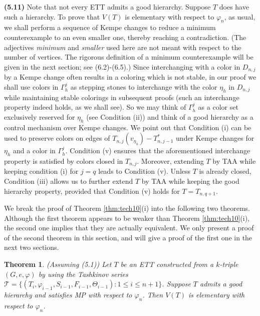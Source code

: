 \documentclass[11pt]{article}
\newtheorem{theorem}{Theorem}[section]
\newcommand{\TT}{\mathcal {T}}
\newcommand{\phiv}{\varphi}
\begin{document}
{\bf (5.11)} Note that not every ETT admits a good hierarchy. Suppose $T$ does have such a hierarchy. To prove that
$V(T)$ is elementary with respect to $\varphi_n$, as usual, we shall perform a sequence of Kempe changes to reduce a minimum counterexample 
to an even smaller one, thereby reaching a contradiction. (The adjectives {\em minimum} and {\em smaller} used here are not meant 
with respect to the number of vertices. The rigorous definition of a minimum counterexample will be given in the next section; see (6.2)-(6.5).) 
Since interchanging with a color in $D_{n,j}$ by a Kempe change often results in 
a coloring which is not stable, in our proof we shall use colors in $\Gamma^{j}_h$ as stepping stones to interchange with the color 
$\eta_h$ in $D_{n,j}$ while maintaining stable colorings in subsequent proofs (such an interchange property indeed holds, as we shall see). 
So we may think of $\Gamma^{j}_h$ as a color set exclusively reserved for $\eta_h$ (see Condition (ii)) and think of a good hierarchy as a 
control mechanism over Kempe changes. We point out that Condition (i) can be used to preserve colors on edges of $T_{n,j}(v_{\eta_h})-T_{n,j-1}^*$ 
under Kempe changes for $\eta_h$ and a color in $\Gamma^{j}_h$. Condition (v) ensures that the aforementioned 
interchange property is satisfied by colors closed in $T_{n,j}$. Moreover, extending $T$ by TAA while keeping condition 
(i) for $j=q$ leads to Condition (v). Unless $T$ is already closed, Condition (iii) allows us to further extend $T$ by TAA
while keeping the good hierarchy property, provided that Condition (v) holds for $T=T_{n,q+1}$.  

\vskip 3mm

We break the proof of Theorem \ref{thm:tech10}(i) into the following two theorems. Although the first theorem appears to
be weaker than Theorem \ref{thm:tech10}(i), the second one implies that they are actually equivalent. 
We only present a proof of the second theorem in this section, and will give a proof of the first one 
in the next two sections.

\begin{theorem}\label{hierarchy}
(Assuming (5.1)) Let $T$ be an ETT constructed from a $k$-triple $(G,e, \varphi)$ by using the Tashkinov series $\TT=\{(T_i, \phiv_{i-1}, S_{i-1}, F_{i-1}, \Theta_{i-1}): 1\le i \le n+1\}$. Suppose $T$ admits a good hierarchy and satisfies
MP with respect to $\varphi_n$. Then $V(T)$ is elementary with respect to $\varphi_n$. 
\end{theorem}
\end{document}

